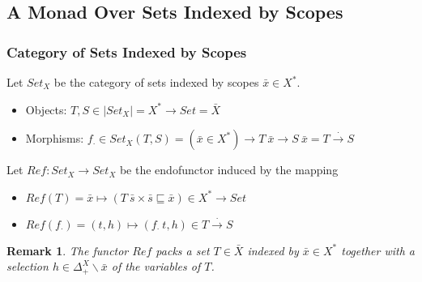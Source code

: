 \documentclass[aspectratio=169]{beamer}
\theoremstyle{remarkstyle}
\newtheorem*{remark}{Remark}
\begin{document}
\subsection{A Monad Over Sets Indexed by Scopes}

\begin{frame}[fragile]
  \frametitle{Category of Sets Indexed by Scopes}
  \begin{definition}
    Let $Set_X$ be the category of sets indexed by scopes $\bar{x} ∈ X^*$.
    \begin{itemize}
      \item Objects: $T, S ∈ |Set_X| = X^* → Set = \bar{X}$
      \item Morphisms: $f_⋅ ∈ Set_X(T, S) = (\bar{x}∈X^*) → T \ \bar{x} → S \ \bar{x} = T \stackrel{⋅}{→} S$
    \end{itemize}
  \end{definition}
  \begin{definition}
    Let $Ref : Set_X → Set_X$ be the endofunctor induced by the mapping
    \begin{itemize}
      \item $Ref(T) = \bar{x} ↦ (T \ \bar{s} × \bar{s} ⊑ \bar{x}) ∈ X^* → Set$
      \item{$Ref(f_⋅) = (t, h) ↦ (f_⋅ \ t , h) ∈ T \stackrel{⋅}{→} S$}
    \end{itemize}
  \end{definition}
  \begin{remark}
    The functor $Ref$ packs a set $T ∈ \bar{X}$ indexed by $\bar{x} ∈ X^*$ together with a selection $h ∈ Δ_+^X∖\bar{x}$ of the variables of $T$.
  \end{remark}
\end{frame}


\end{document}
